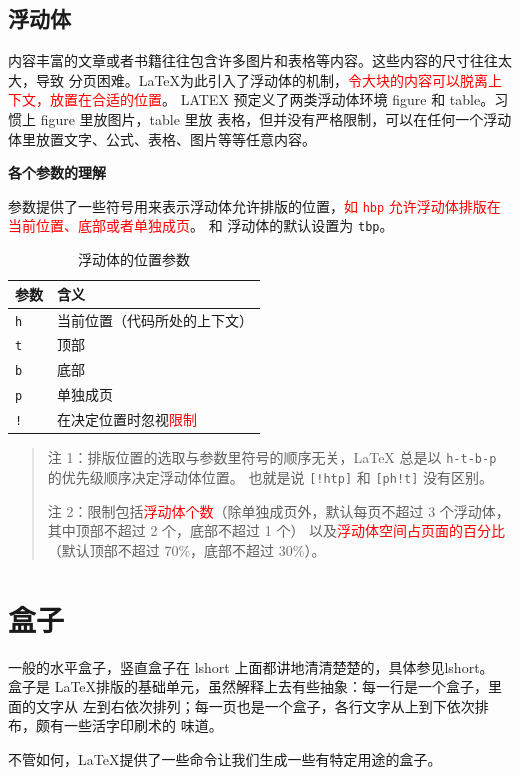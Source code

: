 \documentclass[fontset=windows, 12pt]{article}
\newcommand{\red}[1]{\textcolor{red}{#1}}
\begin{document}
\subsection{浮动体}
内容丰富的文章或者书籍往往包含许多图片和表格等内容。这些内容的尺寸往往太大，导致
分页困难。\LaTeX 为此引入了浮动体的机制，\red{令大块的内容可以脱离上下文，放置在合适的位置}。
LATEX 预定义了两类浮动体环境 figure 和 table。习惯上 figure 里放图片，table 里放
表格，但并没有严格限制，可以在任何一个浮动体里放置文字、公式、表格、图片等等任意内容。


\textbf{各个参数的理解}\par
{} 参数提供了一些符号用来表示浮动体允许排版的位置，\red{如 \texttt{hbp} 允许浮动体排版在当前位置、底部或者单独成页}。
 和  浮动体的默认设置为 \texttt{tbp}。
\begin{table}[htp]
\centering
\caption{浮动体的位置参数}\label{tbl:float-placement}
\begin{tabular}{*{2}{l}}
 \hline
 \textbf{参数} & \textbf{含义} \\
 \hline
 \texttt{h} & 当前位置（代码所处的上下文） \\
 \texttt{t} & 顶部 \\
 \texttt{b} & 底部 \\
 \texttt{p} & 单独成页 \\
 \texttt{!} & 在决定位置时忽视\red{限制} \\
 \hline
\end{tabular}
\begin{quote}\footnotesize
注 1：排版位置的选取与参数里符号的顺序无关，\LaTeX{} 总是以 \texttt{h-t-b-p} 的优先级顺序决定浮动体位置。
也就是说 \texttt{[!htp]} 和 \texttt{[ph!t]} 没有区别。\par
注 2：限制包括\red{浮动体个数}（除单独成页外，默认每页不超过 3 个浮动体，其中顶部不超过 2 个，底部不超过 1 个）
以及\red{浮动体空间占页面的百分比}（默认顶部不超过 70\%，底部不超过 30\%）。
\end{quote}
\end{table}

\section{盒子}
一般的水平盒子，竖直盒子在 lshort 上面都讲地清清楚楚的，具体参见lshort。
盒子是 \LaTeX 排版的基础单元，虽然解释上去有些抽象：每一行是一个盒子，里面的文字从
左到右依次排列；每一页也是一个盒子，各行文字从上到下依次排布，颇有一些活字印刷术的
味道。\par
不管如何，\LaTeX 提供了一些命令让我们生成一些有特定用途的盒子。
\end{document}
